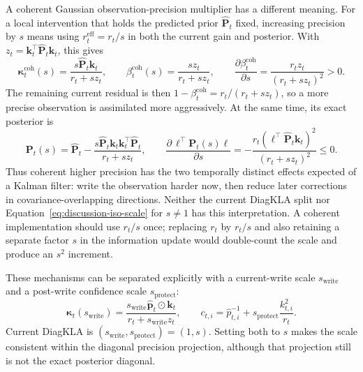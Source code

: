 \documentclass[11pt]{article}
\newcommand{\vct}[1]{\boldsymbol{#1}}
\begin{document}
A coherent Gaussian observation-precision multiplier has a different meaning. For a local
intervention that holds the predicted prior $\widehat{\vct{P}}_t$ fixed, increasing precision by
$s$ means using $r_t^{\mathrm{eff}}=r_t/s$ in both the current gain and posterior. With
$z_t=\vct{k}_t^\top\widehat{\vct{P}}_t\vct{k}_t$, this gives
\begin{equation}
  \vct{\kappa}_t^{\mathrm{coh}}(s)
  =\frac{s\widehat{\vct{P}}_t\vct{k}_t}{r_t+sz_t},
  \qquad
  \beta_t^{\mathrm{coh}}(s)
  =\frac{sz_t}{r_t+sz_t},
  \qquad
  \frac{\partial\beta_t^{\mathrm{coh}}}{\partial s}
  =\frac{r_tz_t}{(r_t+sz_t)^2}>0.
  \label{eq:discussion-coherent-scale-gain}
\end{equation}
The remaining current residual is then
$1-\beta_t^{\mathrm{coh}}=r_t/(r_t+sz_t)$, so a more precise observation is assimilated more
aggressively. At the same time, its exact posterior is
\begin{equation}
  \vct{P}_t(s)
  =\widehat{\vct{P}}_t
  -\frac{s\widehat{\vct{P}}_t\vct{k}_t\vct{k}_t^\top
      \widehat{\vct{P}}_t}{r_t+sz_t},
  \qquad
  \frac{\partial\,\vct{\ell}^\top\vct{P}_t(s)\vct{\ell}}{\partial s}
  =-\frac{r_t(\vct{\ell}^\top\widehat{\vct{P}}_t\vct{k}_t)^2}
    {(r_t+sz_t)^2}\leq0.
  \label{eq:discussion-coherent-scale-posterior}
\end{equation}
Thus coherent higher precision has the two temporally distinct effects expected of a Kalman
filter: write the observation harder now, then reduce later corrections in covariance-overlapping
directions. Neither the current DiagKLA split nor Equation~\eqref{eq:discussion-iso-scale} for
$s\ne1$ has this interpretation. A coherent implementation should use $r_t/s$ once; replacing
$r_t$ by $r_t/s$ and also retaining a separate factor $s$ in the information update would
double-count the scale and produce an $s^2$ increment.

These mechanisms can be separated explicitly with a current-write scale $s_{\mathrm{write}}$ and
a post-write confidence scale $s_{\mathrm{protect}}$:
\begin{equation}
  \vct{\kappa}_t(s_{\mathrm{write}})
  =\frac{s_{\mathrm{write}}\widehat{\vct{p}}_t\odot\vct{k}_t}
    {r_t+s_{\mathrm{write}}z_t},
  \qquad
  c_{t,i}=\widehat p_{t,i}^{-1}
    +s_{\mathrm{protect}}\frac{k_{t,i}^2}{r_t}.
  \label{eq:discussion-two-information-scales}
\end{equation}
Current DiagKLA is $(s_{\mathrm{write}},s_{\mathrm{protect}})=(1,s)$. Setting both to $s$
makes the scale consistent within the diagonal precision projection, although that projection
still is not the exact posterior diagonal.
\end{document}
